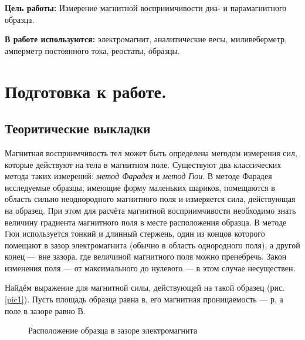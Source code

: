\documentclass[a4paper,12pt]{article} %
\begin{document}
\textbf{Цель работы:} Измерение магнитной восприимчивости диа- и парамагнитного образца.

\textbf{В работе используются:} электромагнит, аналитические весы, миливеберметр, амперметр постоянного тока, реостаты, образцы.

\section{Подготовка к работе.}

\subsection{Теоритические выкладки}

Магнитная восприимчивость тел может быть определена мегодом измерения сил, которые действуют на тела в магнитном поле. Существуют два классических метода таких измерений: \textit{метод Фарадея} и \textit{метод Гюи}. В методе Фарадея исследуемые образцы, имеющие форму маленьких шариков, помещаются в область сильно неоднородного магнитного поля и измеряется сила, действующая на образец. При этом для расчёта магнитной восприимчивости необходимо знать величину градиента магнитного поля в месте расположения образца. В методе Гюи используется тонкий и длинный стержень, один из концов которого помещают в зазор электромагнита (обычно в область однородного поля), а другой конец — вне зазора, где величиной магнитного поля можно пренебречь. Закон изменения поля — от максимального до нулевого — в этом случае несуществен.

Найдём выражение для магнитной силы, действующей на такой образец (рис. \eqref{pic1}). Пусть площадь образца равна в, его магнитная проницаемость — р, а поле в зазоре равно В.

\begin{figure}[H]\label{pic1}
	\caption{Расположение образца в зазоре электромагнита}
\end{figure}
\end{document}
